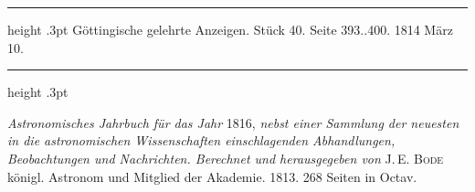 \par\bigskip
\hypertarget{native-568-lower}{}
\begin{center}
\parbox{.78\linewidth}{%
\centering\small
\hrule height .3pt\relax\vspace{2.5pt}
Göttingische gelehrte Anzeigen. Stück 40. Seite 393..400. 1814 März 10.\par
\vspace{2.5pt}\hrule height .3pt\relax
}
\end{center}

\emph{Astronomisches Jahrbuch für das Jahr} 1816, \emph{nebst einer Sammlung der neuesten in die astronomischen Wissenschaften einschlagenden Abhandlungen, Beobachtungen und Nachrichten. Berechnet und herausgegeben von} J.\,E. \textsc{Bode} königl. Astronom und Mitglied der Akademie. 1813. 268 Seiten in Octav.

